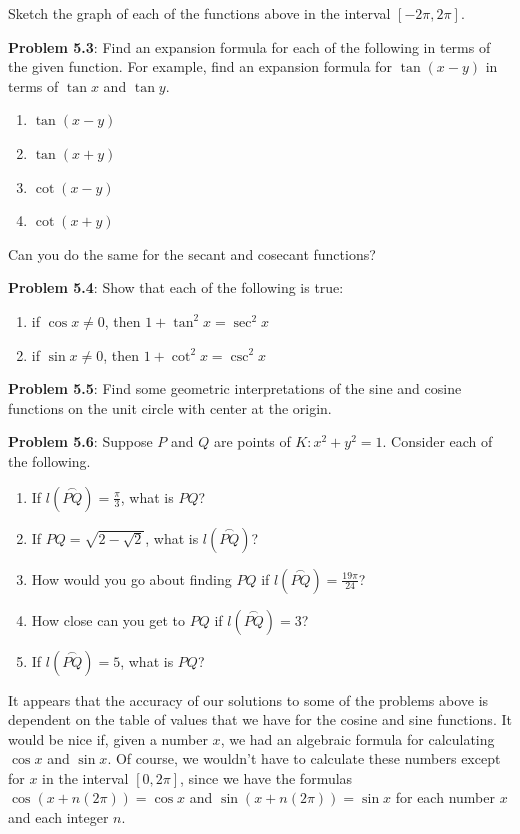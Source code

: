 \documentclass[english]{book}
\newcommand{\arc}[1]{\overset{\frown}{#1} }
\begin{document}
Sketch the graph of each of the functions above in the interval $[-2\pi,2\pi]$.

\vspace{0.3cm}

\textbf{Problem 5.3}: Find an expansion formula for each of the following in terms of the given function. For example, find an expansion formula for $\tan(x-y)$ in terms of $\tan x$ and $\tan y$.
\begin{enumerate}[\hspace{1cm}1)]
  \item $\tan (x-y)$
  \item $\tan (x+y)$
  \item $\cot (x-y)$
  \item $\cot (x+y)$
\end{enumerate}
Can you do the same for the secant and cosecant functions?

\vspace{0.3cm}

\textbf{Problem 5.4}: Show that each of the following is true:
\begin{enumerate}[\hspace{1cm}1)]
  \item if $\cos x \neq 0$, then $1+\tan^{2}x = \sec^{2}x$
  \item if $\sin x \neq 0$, then $1+\cot^{2}x = \csc^{2}x$
\end{enumerate}

\textbf{Problem 5.5}: Find some geometric interpretations of the sine and cosine functions on the unit circle with center at the origin.

\vspace{0.3cm}

\textbf{Problem 5.6}: Suppose $P$ and $Q$ are points of $K:x^{2}+y^{2}=1$. Consider each of the following.
\begin{enumerate}[\hspace{1cm}a)]
  \item If $l(\arc{PQ})=\frac{\pi}{3}$, what is $PQ$?
  \item If $PQ=\sqrt{2-\sqrt{2}}$, what is $l(\arc{PQ})$? 
  \item How would you go about finding $PQ$ if $l(\arc{PQ})=\frac{19\pi}{24}$? 
  \item How close can you get to $PQ$ if $l(\arc{PQ})=3$? 
  \item If $l(\arc{PQ})=5$, what is $PQ$?
\end{enumerate}

It appears that the accuracy of our solutions to some of the problems above is dependent on the table of values that we have for the cosine and sine functions. It would be nice if, given a number $x$, we had an algebraic formula for calculating $\cos x$ and $\sin x$. Of course, we wouldn't have to calculate these numbers except for $x$ in the interval $[0,2\pi]$, since we have the formulas $\cos(x+n(2\pi))=\cos x$ and $\sin(x+n(2\pi))=\sin x$ for each number $x$ and each integer $n$. 
\end{document}
